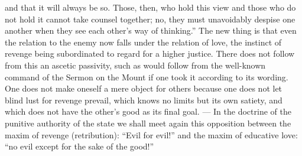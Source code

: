 \documentclass[12pt,a4paper,openany]{book}
\newcommand{\opage}[1]{\marginnote{\footnotesize\textit{[#1]}}}
\begin{document}
and that it will always be so. Those, then, who hold this view and those who do not hold it cannot take counsel
together; no, they must unavoidably despise one another when they see each other's way of thinking.'' The new thing is
that even the relation to the enemy now falls under the relation of love, the instinct of revenge being subordinated
to regard for a higher justice. There does not follow from this an ascetic passivity, such as would follow from the
well-known command of the Sermon on the Mount if one took it according to its wording. One does not make oneself a
mere object for others because one does not let blind lust for revenge prevail, which knows no limits but its own
satiety, and which does not have the other's good as its final goal. --- In the doctrine of the
\opage{247}punitive authority of the state we shall meet again this opposition between the maxim of revenge
(retribution): ``Evil for evil!'' and the maxim of educative love: ``no evil except for the sake of the good!''
\end{document}
